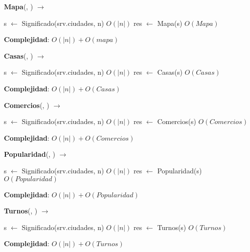\begin{Algoritmos}
\begin{algorithm}[H]{\textbf{Mapa}(, ) $\to$ }
\begin{algorithmic}[1]
    \State s $\gets$ Significado(srv.ciudades, n) \Comment $O(|n|)$
    \State res $\gets$ Mapa(s) \Comment $O(Mapa)$
\end{algorithmic}
\textbf{Complejidad}: $O(|n|) + O(mapa)$
\end{algorithm}

\begin{algorithm}[H]{\textbf{Casas}(, ) $\to$ }
\begin{algorithmic}[1]
    \State s $\gets$ Significado(srv.ciudades, n) \Comment $O(|n|)$
    \State res $\gets$ Casas(s) \Comment $O(Casas)$
\end{algorithmic}
\textbf{Complejidad}: $O(|n|) + O(Casas)$
\end{algorithm}

\begin{algorithm}[H]{\textbf{Comercios}(, ) $\to$ }
\begin{algorithmic}[1]
    \State s $\gets$ Significado(srv.ciudades, n) \Comment $O(|n|)$
    \State res $\gets$ Comercios(s) \Comment $O(Comercios)$
\end{algorithmic}
\textbf{Complejidad}: $O(|n|) + O(Comercios)$
\end{algorithm}

\begin{algorithm}[H]{\textbf{Popularidad}(, ) $\to$ }
\begin{algorithmic}[1]
    \State s $\gets$ Significado(srv.ciudades, n) \Comment $O(|n|)$
    \State res $\gets$ Popularidad(s) \Comment $O(Popularidad)$
\end{algorithmic}
\textbf{Complejidad}: $O(|n|) + O(Popularidad)$
\end{algorithm}

\begin{algorithm}[H]{\textbf{Turnos}(, ) $\to$ }
\begin{algorithmic}[1]
    \State s $\gets$ Significado(srv.ciudades, n) \Comment $O(|n|)$
    \State res $\gets$ Turnos(s) \Comment $O(Turnos)$
\end{algorithmic}
\textbf{Complejidad}: $O(|n|) + O(Turnos)$
\end{algorithm}

\end{Algoritmos}
